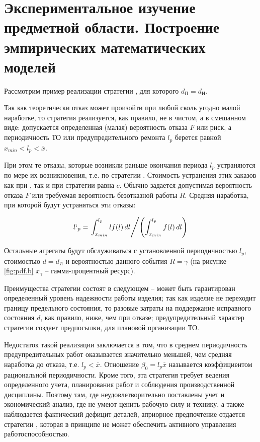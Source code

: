 \documentclass[../nirs.tex]{subfiles}
\begin{document}
\section{Экспериментальное изучение предметной области. Построение эмпирических
математических моделей}

Рассмотрим пример реализации стратегии , для которого $d_\text{П} =
d_\text{И}$.

Так как теоретически отказ может произойти при любой сколь угодно малой
наработке, то стратегия  реализуется, как правило, не в чистом, а в
смешанном виде: допускается определенная (малая) вероятность отказа $F$ или
риск, а периодичность ТО или предупредительного ремонта $l_p$ берется равной
$x_{min} < l_p < \overline{x}$.

При этом те отказы, которые возникли раньше окончания периода $l_p$ устраняются
по мере их возникновения, т.е. по стратегии . Стоимость устранения этих
заказов как при , так и при  стратегии равна $c$. Обычно задается
допустимая вероятность отказа $F$ или требуемая вероятность безотказной работы
$R$. Средняя наработка, при которой будут устраняться эти отказы:

\begin{equation*}
    l`_p =
    \left.
    \int_{x_{min}}^{l_p} lf(l)\,dl
    \middle/
    \left( \int_{x_{min}}^{l_p} f(l)\,dl \right)
    \right.
\end{equation*}

Остальные агрегаты будут обслуживаться с установленной периодичностью $l_p$,
стоимостью $d = d_\text{И}$ и вероятностью данного события $R = \gamma$ (на
рисунке \ref{fig:pdf.b} $x_\gamma$ -- гамма-процентный ресурс).

Преимущества стратегии  состоят в следующем -- может быть гарантирован
определенный уровень надежности работы изделия; так как изделие не переходит
границу предельного состояния, то разовые затраты на поддержание исправного
состояния $d$, как правило, ниже, чем при отказе; предупредительный характер
стратегии  создает предпосылки, для плановой организации ТО.

Недостаток такой реализации заключается в том, что в среднем периодичность
предупредительных работ оказывается значительно меньшей, чем средняя наработка
до отказа, т.е. $l_p < \overline{x}$. Отношение $\beta_0 = l_p \overline{x}$
называется коэффициентом рациональной периодичности. Кроме того, эта стратегия
требует ведения определенного учета, планирования работ и соблюдения
производственной дисциплины. Поэтому там, где неудовлетворительно поставлены
учет и экономический анализ, где не умеют ценить рабочую силу и технику, а также
наблюдается фактический дефицит деталей, априорное предпочтение отдается
стратегии , которая в принципе не может обеспечить активного управления
работоспособностью.
\end{document}
